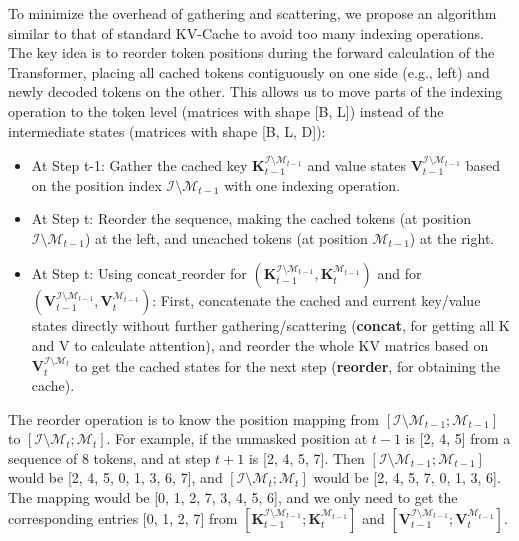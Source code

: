 \documentclass{article}
\begin{document}
To minimize the overhead of gathering and scattering, we propose an algorithm similar to that of standard KV-Cache to avoid too many indexing operations. 
The key idea is to reorder token positions during the forward calculation of the Transformer, placing all cached tokens contiguously on one side (e.g., left) and newly decoded tokens on the other. 
This allows us to move parts of the indexing operation to the token level (matrices with shape [B, L]) instead of the intermediate states (matrices with shape [B, L, D]):
\begin{itemize}
    \item At Step t-1: Gather the cached key $\mathbf{K}_{t-1}^{\mathcal{I}\setminus\mathcal{M}_{t-1}}$ and value states $\mathbf{V}_{t-1}^{\mathcal{I}\setminus\mathcal{M}_{t-1}}$ based on the position index $\mathcal{I}\setminus\mathcal{M}_{t-1}$ with one indexing operation.
    \item At Step t: Reorder the sequence, making the cached tokens (at position $\mathcal{I}\setminus\mathcal{M}_{t-1}$) at the left, and uncached tokens (at position $\mathcal{M}_{t-1}$) at the right.
    \item At Step t: Using $\operatorname{concat\_{reorder}}$ for $\left(\mathbf{K}_{t-1}^{\mathcal{I}\setminus\mathcal{M}_{t-1}}, \mathbf{K}_{t}^{\mathcal{M}_{t-1}}\right)$ and for $\left(\mathbf{V}_{t-1}^{\mathcal{I}\setminus\mathcal{M}_{t-1}}, \mathbf{V}_{t}^{\mathcal{M}_{t-1}}\right)$: 
    First, concatenate the cached and current key/value states directly without further gathering/scattering (\textbf{concat}, for getting all K and V to calculate attention), 
    and reorder the whole KV matrics based on $\mathbf{V}_{t}^{\mathcal{I}\setminus\mathcal{M}_{t}}$ to get the cached states for the next step (\textbf{reorder}, for obtaining the cache).
\end{itemize}
The reorder operation is to know the position mapping from $[\mathcal{I}\setminus\mathcal{M}_{t-1}; \mathcal{M}_{t-1}]$ to $[\mathcal{I}\setminus\mathcal{M}_{t}; \mathcal{M}_{t}]$. 
For example, if the unmasked position at $t-1$ is [2, 4, 5] from a sequence of 8 tokens, and at step $t+1$ is [2, 4, 5, 7].
Then $[\mathcal{I}\setminus\mathcal{M}_{t-1}; \mathcal{M}_{t-1}]$ would be [2, 4, 5, 0, 1, 3, 6, 7], and $[\mathcal{I}\setminus\mathcal{M}_{t}; \mathcal{M}_{t}]$ would be [2, 4, 5, 7, 0, 1, 3, 6].
The mapping would be [0, 1, 2, 7, 3, 4, 5, 6], and we only need to get the corresponding entries [0, 1, 2, 7] from $\left[\mathbf{K}_{t-1}^{\mathcal{I}\setminus\mathcal{M}_{t-1}}; \mathbf{K}_{t}^{\mathcal{M}_{t-1}}\right]$ and $\left[\mathbf{V}_{t-1}^{\mathcal{I}\setminus\mathcal{M}_{t-1}}; \mathbf{V}_{t}^{\mathcal{M}_{t-1}}\right]$.
\end{document}
